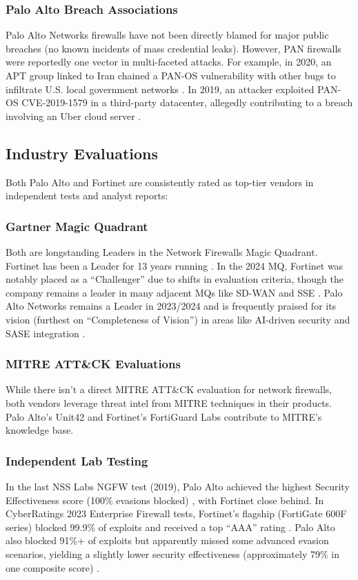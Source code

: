 \documentclass[12pt]{article}
\begin{document}
\subsubsection{Palo Alto Breach Associations}
Palo Alto Networks firewalls have not been directly blamed for major public breaches (no known incidents of mass credential leaks). However, PAN firewalls were reportedly one vector in multi-faceted attacks. For example, in 2020, an APT group linked to Iran chained a PAN-OS vulnerability with other bugs to infiltrate U.S. local government networks \cite{cisapalo2024}. In 2019, an attacker exploited PAN-OS CVE-2019-1579 in a third-party datacenter, allegedly contributing to a breach involving an Uber cloud server \cite{threatpost2019}.

\subsection{Industry Evaluations}

Both Palo Alto and Fortinet are consistently rated as top-tier vendors in independent tests and analyst reports:

\subsubsection{Gartner Magic Quadrant}
Both are longstanding Leaders in the Network Firewalls Magic Quadrant. Fortinet has been a Leader for 13 years running \cite{fortinetgartner2023}. In the 2024 MQ, Fortinet was notably placed as a ``Challenger'' due to shifts in evaluation criteria, though the company remains a leader in many adjacent MQs like SD-WAN and SSE \cite{gartnerquadrant2023}. Palo Alto Networks remains a Leader in 2023/2024 and is frequently praised for its vision (furthest on ``Completeness of Vision'') in areas like AI-driven security and SASE integration \cite{gartnerquadrant2023}.

\subsubsection{MITRE ATT\&CK Evaluations}
While there isn't a direct MITRE ATT\&CK evaluation for network firewalls, both vendors leverage threat intel from MITRE techniques in their products. Palo Alto's Unit42 and Fortinet's FortiGuard Labs contribute to MITRE's knowledge base.

\subsubsection{Independent Lab Testing}
In the last NSS Labs NGFW test (2019), Palo Alto achieved the highest Security Effectiveness score (100\% evasions blocked) \cite{nsslabs2019}, with Fortinet close behind. In CyberRatings 2023 Enterprise Firewall tests, Fortinet's flagship (FortiGate 600F series) blocked 99.9\% of exploits and received a top ``AAA'' rating \cite{cyberratings2023}. Palo Alto also blocked 91\%+ of exploits but apparently missed some advanced evasion scenarios, yielding a slightly lower security effectiveness (approximately 79\% in one composite score) \cite{cyberratings2023exclusivenetworks}.
\end{document}
